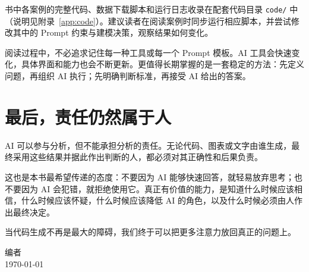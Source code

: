 书中各案例的完整代码、数据下载脚本和运行日志收录在配套代码目录 \texttt{code/} 中（说明见附录~\ref{app:code}）。建议读者在阅读案例时同步运行相应脚本，并尝试修改其中的 Prompt 约束与建模决策，观察结果如何变化。

阅读过程中，不必追求记住每一种工具或每一个 Prompt 模板。AI 工具会快速变化，具体界面和能力也会不断更新。更值得长期掌握的是一套稳定的方法：先定义问题，再组织 AI 执行；先明确判断标准，再接受 AI 给出的答案。

\section*{最后，责任仍然属于人}

AI 可以参与分析，但不能承担分析的责任。无论代码、图表或文字由谁生成，最终采用这些结果并据此作出判断的人，都必须对其正确性和后果负责。

这也是本书最希望传递的态度：不要因为 AI 能够快速回答，就轻易放弃思考；也不要因为 AI 会犯错，就拒绝使用它。真正有价值的能力，是知道什么时候应该相信，什么时候应该怀疑，什么时候应该降低 AI 的角色，以及什么时候必须由人作出最终决定。

当代码生成不再是最大的障碍，我们终于可以把更多注意力放回真正的问题上。

\vspace{2em}
\begin{flushright}
编者\\
\today
\end{flushright}
